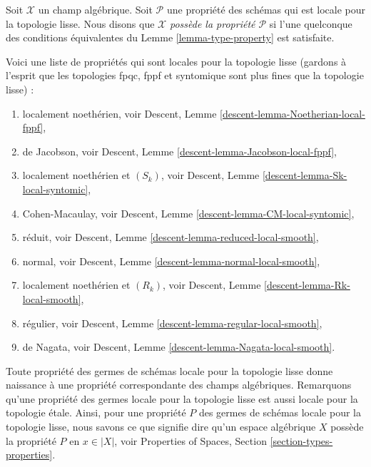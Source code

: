 \begin{definition}
\label{definition-type-property}
Soit $\mathcal{X}$ un champ algébrique.
Soit $\mathcal{P}$ une propriété des schémas qui est
locale pour la topologie lisse.
Nous disons que $\mathcal{X}$ {\it possède la propriété $\mathcal{P}$}
si l'une quelconque des conditions équivalentes du
Lemme \ref{lemma-type-property}
est satisfaite.
\end{definition}

\begin{remark}
\label{remark-list-properties-local-smooth-topology}
Voici une liste de propriétés qui sont locales pour la topologie lisse
(gardons à l'esprit que les topologies fpqc, fppf et syntomique sont
plus fines que la topologie lisse) :
\begin{enumerate}
\item localement noethérien, voir
Descent, Lemme \ref{descent-lemma-Noetherian-local-fppf},
\item de Jacobson, voir
Descent, Lemme \ref{descent-lemma-Jacobson-local-fppf},
\item localement noethérien et $(S_k)$, voir
Descent, Lemme \ref{descent-lemma-Sk-local-syntomic},
\item Cohen-Macaulay, voir
Descent, Lemme \ref{descent-lemma-CM-local-syntomic},
\item réduit, voir
Descent, Lemme \ref{descent-lemma-reduced-local-smooth},
\item normal, voir
Descent, Lemme \ref{descent-lemma-normal-local-smooth},
\item localement noethérien et $(R_k)$, voir
Descent, Lemme \ref{descent-lemma-Rk-local-smooth},
\item régulier, voir
Descent, Lemme \ref{descent-lemma-regular-local-smooth},
\item de Nagata, voir
Descent, Lemme \ref{descent-lemma-Nagata-local-smooth}.
\end{enumerate}
\end{remark}

\noindent
Toute propriété des germes de schémas locale pour la topologie lisse donne naissance à une
propriété correspondante des champs algébriques. Remarquons qu'une propriété des germes locale pour la topologie lisse
est aussi locale pour la topologie \'etale. Ainsi, pour une propriété $P$ des germes de
schémas locale pour la topologie lisse, nous savons ce que signifie dire qu'un espace algébrique $X$ possède
la propriété $P$ en $x \in |X|$, voir
Properties of Spaces, Section \ref{section-types-properties}.

